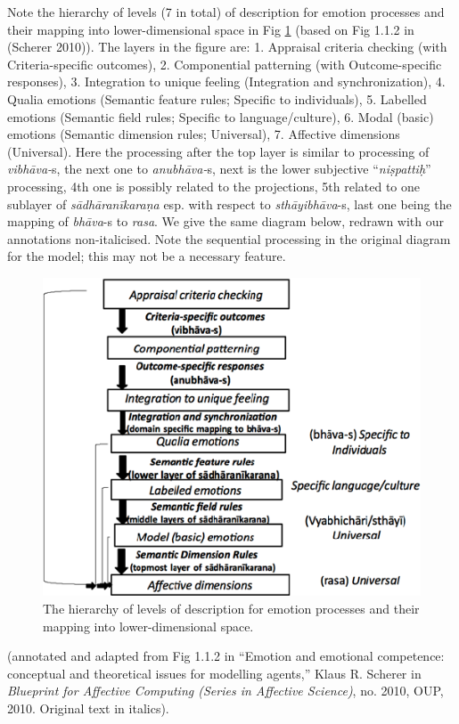 Note the hierarchy of levels (7 in total) of description for emotion processes and their mapping into lower-dimensional space in Fig \ref{chap7-fig1} (based on Fig 1.1.2 in (Scherer 2010)). The layers in the figure are: 1. Appraisal criteria checking (with Criteria-specific outcomes), 2. Componential patterning (with Outcome-specific responses), 3. Integration to unique feeling (Integration and synchronization), 4. Qualia emotions (Semantic feature rules; Specific to individuals), 5. Labelled emotions (Semantic field rules; Specific to language/culture), 6. Modal (basic) emotions (Semantic dimension rules; Universal), 7. Affective dimensions (Universal). Here the processing after the top layer is similar to processing of \textsl{vibhāva-}s, the next one to \textsl{anubhāva-}s, next is the lower subjective “\textsl{niṣpattiḥ}” processing, 4th one is possibly related to the projections, 5th related to one sublayer of \textsl{sādhāranīkaraṇa} esp. with respect to \textsl{sthāyibhāva}-s, last one being the mapping of \textsl{bhāva}-s to \textsl{rasa}. We give the same diagram below, redrawn with our annotations non-italicised. Note the sequential processing in the original diagram for the model; this may not be a necessary feature. 

\begin{figure}[H]
\centering
\includegraphics{figures/3.eps}
\caption{The hierarchy of levels of description for emotion processes and their mapping into lower-dimensional space.}\label{chap7-fig1}
\end{figure}
(annotated and adapted from Fig 1.1.2 in “Emotion and emotional competence: conceptual and theoretical issues for modelling agents,” Klaus R. Scherer in \textsl{Blueprint for Affective Computing (Series in Affective Science)}, no. 2010, OUP, 2010. Original text in italics).

